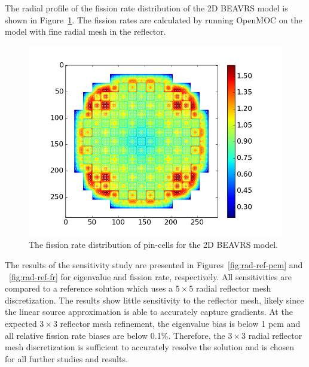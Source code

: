The radial profile of the fission rate distribution of the 2D BEAVRS model is shown in Figure~\ref{fig:beavrs-2d-radial}. The fission rates are calculated by running OpenMOC on the model with fine radial mesh in the reflector.

\begin{figure}[h!]
	\centering
	\includegraphics[width=0.9\linewidth]{figures/results/rr-plots/beavrs-2d-radial.png}
	\caption[]{The fission rate distribution of pin-cells for the 2D BEAVRS model.}
	\label{fig:beavrs-2d-radial}
\end{figure}

The results of the sensitivity study are presented in Figures~\ref{fig:rad-ref-pcm} and ~\ref{fig:rad-ref-fr} for eigenvalue and fission rate, respectively. All sensitivities are compared to a reference solution which uses a $5\times 5$ radial reflector mesh discretization. The results show little sensitivity to the reflector mesh, likely since the linear source approximation is able to accurately capture gradients. At the expected $3 \times 3$ reflector mesh refinement, the eigenvalue bias is below 1 pcm and all relative fission rate biases are below 0.1\%. Therefore, the  $3 \times 3$ radial reflector mesh discretization is sufficient to accurately resolve the solution and is chosen for all further studies and results.

